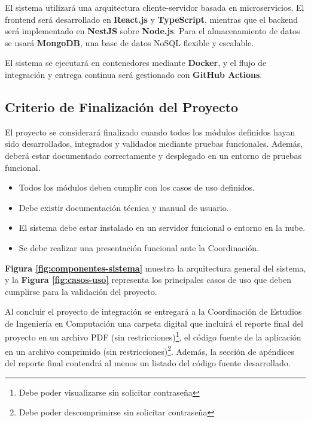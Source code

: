 El sistema utilizará una arquitectura cliente-servidor basada en microservicios. El frontend será desarrollado en \textbf{React.js} y \textbf{TypeScript}, mientras que el backend será implementado en \textbf{NestJS} sobre \textbf{Node.js}. Para el almacenamiento de datos se usará \textbf{MongoDB}, una base de datos NoSQL flexible y escalable.

El sistema se ejecutará en contenedores mediante \textbf{Docker}, y el flujo de integración y entrega continua será gestionado con \textbf{GitHub Actions}.

\subsection{Criterio de Finalización del Proyecto}

El proyecto se considerará finalizado cuando todos los módulos definidos hayan sido desarrollados, integrados y validados mediante pruebas funcionales. Además, deberá estar documentado correctamente y desplegado en un entorno de pruebas funcional.

\begin{itemize}
    \item Todos los módulos deben cumplir con los casos de uso definidos.
    \item Debe existir documentación técnica y manual de usuario.
    \item El sistema debe estar instalado en un servidor funcional o entorno en la nube.
    \item Se debe realizar una presentación funcional ante la Coordinación.
\end{itemize}

\textbf{Figura \ref{fig:componentes-sistema}} muestra la arquitectura general del sistema, y la \textbf{Figura \ref{fig:casos-uso}} representa los principales casos de uso que deben cumplirse para la validación del proyecto.

\vspace{0.5cm}

Al concluir el proyecto de integración se entregará a la Coordinación de Estudios de Ingeniería en Computación una carpeta digital que incluirá el reporte final del proyecto en un archivo PDF (sin restricciones)\footnote{Debe poder visualizarse sin solicitar contraseña}, el código fuente de la aplicación en un archivo comprimido (sin restricciones)\footnote{Debe poder descomprimirse sin solicitar contraseña}. Además, la sección de apéndices del reporte final contendrá al menos un listado del código fuente desarrollado.

